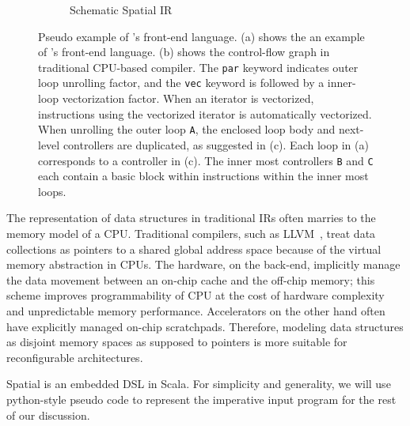 \begin{figure}
\begin{subfigure}[b]{0.25\textwidth}
\caption{Schematic Spatial IR}
\end{subfigure}
\caption[Spatial Example]{
  Pseudo example of \name's front-end language.
  (a) shows the an example of \name's front-end language. 
  (b) shows the control-flow graph in traditional CPU-based compiler.
  The \texttt{par} keyword indicates outer loop unrolling factor, and
  the \texttt{vec} keyword is followed by a inner-loop vectorization factor.
  When an iterator is vectorized, instructions using the vectorized iterator is automatically
  vectorized. When unrolling the outer loop \texttt{A}, the enclosed loop body and
  next-level controllers are duplicated, as suggested in (c).
  Each loop in (a) corresponds to a controller in (c). The inner most controllers \texttt{B} and
  \texttt{C} each contain a basic block within instructions within the inner most loops.
}
\label{fig:spatialegpar}
\end{figure}

The representation of data structures in traditional IRs often marries to the memory model of a 
CPU. Traditional compilers, such as LLVM~\cite{llvm}, treat data collections as pointers to a shared
global address space because of the virtual memory abstraction in CPUs.
The hardware, on the back-end, implicitly manage the data movement between an on-chip cache and the off-chip 
memory; this scheme improves programmability of CPU at the cost of hardware complexity and
unpredictable memory
performance.
Accelerators on the other hand often have explicitly managed on-chip scratchpads.
Therefore, modeling data structures as disjoint memory spaces as supposed to pointers is more suitable for reconfigurable architectures.

Spatial is an embedded DSL in Scala.
For simplicity and generality, we will use python-style pseudo code to represent the imperative
input program for the rest of our discussion.
